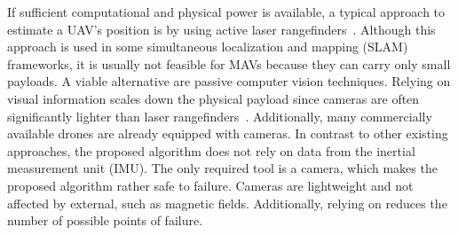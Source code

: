 If sufficient computational and physical power is available, a typical
approach to estimate a UAV's position is by using active laser
rangefinders~\cite{grzonka2009towards,bachrach2009autonomous}.
Although this approach is used in some simultaneous localization and
mapping (SLAM) frameworks, it is usually not feasible for MAVs because
they can carry only small payloads. A viable alternative are passive
computer vision techniques. Relying on visual information scales down
the physical payload since cameras are often significantly lighter
than laser
rangefinders~\cite{blosch2010vision,angeli20062d,ahrens2009vision}.
Additionally, many commercially available drones are already equipped
with cameras. In contrast to other existing approaches, the proposed algorithm does not rely on data from the inertial measurement unit (IMU). The only required tool is a camera, which makes the proposed algorithm rather safe to failure. Cameras are lightweight and not affected by external, such as magnetic fields. Additionally, relying on reduces the number of possible points of failure.  